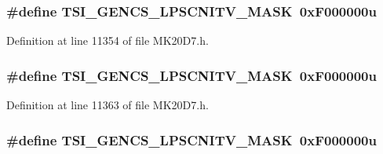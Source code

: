 \subsubsection[{\texorpdfstring{T\+S\+I\+\_\+\+G\+E\+N\+C\+S\+\_\+\+L\+P\+S\+C\+N\+I\+T\+V\+\_\+\+M\+A\+SK}{TSI_GENCS_LPSCNITV_MASK}}]{\setlength{\rightskip}{0pt plus 5cm}\#define T\+S\+I\+\_\+\+G\+E\+N\+C\+S\+\_\+\+L\+P\+S\+C\+N\+I\+T\+V\+\_\+\+M\+A\+SK~0x\+F000000u}\hypertarget{group___t_s_i___register___masks_gaf89fb1d534403dbb1be0df6093c0d529}{}\label{group___t_s_i___register___masks_gaf89fb1d534403dbb1be0df6093c0d529}


Definition at line 11354 of file M\+K20\+D7.\+h.

\subsubsection[{\texorpdfstring{T\+S\+I\+\_\+\+G\+E\+N\+C\+S\+\_\+\+L\+P\+S\+C\+N\+I\+T\+V\+\_\+\+M\+A\+SK}{TSI_GENCS_LPSCNITV_MASK}}]{\setlength{\rightskip}{0pt plus 5cm}\#define T\+S\+I\+\_\+\+G\+E\+N\+C\+S\+\_\+\+L\+P\+S\+C\+N\+I\+T\+V\+\_\+\+M\+A\+SK~0x\+F000000u}\hypertarget{group___t_s_i___register___masks_gaf89fb1d534403dbb1be0df6093c0d529}{}\label{group___t_s_i___register___masks_gaf89fb1d534403dbb1be0df6093c0d529}


Definition at line 11363 of file M\+K20\+D7.\+h.

\subsubsection[{\texorpdfstring{T\+S\+I\+\_\+\+G\+E\+N\+C\+S\+\_\+\+L\+P\+S\+C\+N\+I\+T\+V\+\_\+\+M\+A\+SK}{TSI_GENCS_LPSCNITV_MASK}}]{\setlength{\rightskip}{0pt plus 5cm}\#define T\+S\+I\+\_\+\+G\+E\+N\+C\+S\+\_\+\+L\+P\+S\+C\+N\+I\+T\+V\+\_\+\+M\+A\+SK~0x\+F000000u}\hypertarget{group___t_s_i___register___masks_gaf89fb1d534403dbb1be0df6093c0d529}{}\label{group___t_s_i___register___masks_gaf89fb1d534403dbb1be0df6093c0d529}



